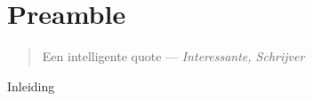 \chapter*{Preamble}
\begin{quote}
Een intelligente quote
--- \emph{Interessante, Schrijver}
\end{quote}

Inleiding
